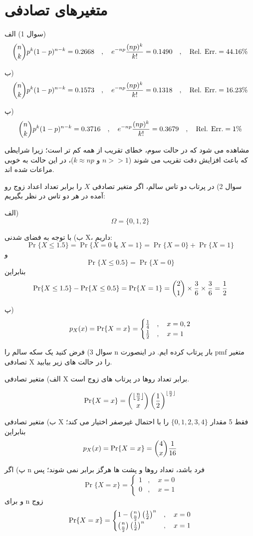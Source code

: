 \documentclass[10pt,letterpaper]{report}
\begin{document}
\chapter{متغیرهای تصادفی}

سوال 1) الف) 
$$
\binom{n}{k}p^k(1-p)^{n-k}=0.2668\quad,\quad e^{-np}{(np)^k\over k!}=0.1490\quad,\quad \text{Rel. Err.}= 44.16\%
$$

ب)
$$
\binom{n}{k}p^k(1-p)^{n-k}=0.1573\quad,\quad e^{-np}{(np)^k\over k!}=0.1318\quad,\quad \text{Rel. Err.}= 16.23\%
$$

پ)
$$
\binom{n}{k}p^k(1-p)^{n-k}=0.3716\quad,\quad e^{-np}{(np)^k\over k!}=0.3679\quad,\quad \text{Rel. Err.}= 1\%
$$

مشاهده می شود که در حالت سوم، خطای تقریب از همه کم تر است؛ زیرا شرایطی که باعث افزایش دقت تقریب می شوند ($n>>1$ و $k\approx np$)، در این حالت به خوبی مراعات شده اند.

سوال 2) در پرتاب دو تاس سالم، اگر متغیر تصادفی $X$ را برابر تعداد اعداد زوج رو آمده در هر دو تاس در نظر بگیریم:

الف) 
$$
\Omega=\{0,1,2\}
$$

ب) با توجه به فضای شدنی X، داریم:
$$
\Pr\{X\le1.5\}=\Pr\{X=0\text{ یا } X=1\}=\Pr\{X=0\}+\Pr\{X=1\}
$$
و
$$
\Pr\{X\le0.5\}=\Pr\{X=0\}
$$
بنابراین 
$$
\Pr\{X\le1.5\}-\Pr\{X\le0.5\}=\Pr\{X=1\}=\binom{2}{1}\times {3\over 6}\times {3\over 6}={1\over 2}
$$

پ)
$$
p_X(x)=\Pr\{X=x\}=
\begin{cases}
{1\over 4}&,\quad x=0,2\\
{1\over 2}&,\quad x=1
\end{cases}
$$

سوال 3) فرض کنید یک سکه سالم را n بار پرتاب کرده ایم. در اینصورت pmf متغیر تصادفی X را در حالت های زیر بیابید.

الف) متغیر تصادفی X برابر تعداد روها در پرتاب های زوج است. 

$$
\Pr\{X=x\}=\binom{\lfloor{n\over 2}\rfloor}{x}\left({1\over 2}\right)^{\lfloor{n\over 2}\rfloor}
$$

ب) متغیر تصادفی X فقط 5 مقدار 
$
\{0,1,2,3,4\}
$
را با احتمال غیرصفر اختیار می کند؛ بنابراین
$$
p_X(x)=\Pr\{X=x\}=
\binom{4}{x}{1\over 16}
$$

پ) اگر n فرد باشد، تعداد روها و پشت ها هرگز برابر نمی شوند؛ پس 
$$
\Pr\{X=x\}=\begin{cases}
1&,\quad x=0\\
0&,\quad x=1
\end{cases}
$$
و برای n زوج
$$
\Pr\{X=x\}=\begin{cases}
1-\binom{n}{{n\over 2}}\left({1\over 2}\right)^n&,\quad x=0\\
\binom{n}{{n\over 2}}\left({1\over 2}\right)^n&,\quad x=1
\end{cases}
$$
\end{document}
